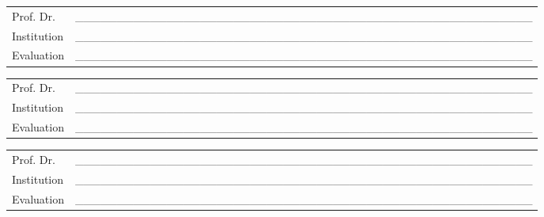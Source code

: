 \documentclass[
12pt,
openright,
oneside,
a4paper,
chapter=TITLE,
section=TITLE,
french,
spanish,
brazil,
english
]{abntex2}
\begin{document}
\begin{folhadeaprovacao}
  \vspace*{0.25cm}

  \noindent
  \begin{tabular}{m{2cm} P{14cm}}
    Prof. Dr. & \_\_\_\_\_\_\_\_\_\_\_\_\_\_\_\_\_\_\_\_\_\_\_\_\_\_\_\_\_\_\_\_\_\_\_\_\_\_\_\_\_\_\_\_\_\_\_\_\_\_\_\_\_\_\_ \\
    Institution & \_\_\_\_\_\_\_\_\_\_\_\_\_\_\_\_\_\_\_\_\_\_\_\_\_\_\_\_\_\_\_\_\_\_\_\_\_\_\_\_\_\_\_\_\_\_\_\_\_\_\_\_\_\_\_ \\
    Evaluation & \_\_\_\_\_\_\_\_\_\_\_\_\_\_\_\_\_\_\_\_\_\_\_\_\_\_\_\_\_\_\_\_\_\_\_\_\_\_\_\_\_\_\_\_\_\_\_\_\_\_\_\_\_\_\_ \\
  \end{tabular}

  \vspace*{0.5cm}

  \noindent
  \begin{tabular}{m{2cm} P{14cm}}
    Prof. Dr. & \_\_\_\_\_\_\_\_\_\_\_\_\_\_\_\_\_\_\_\_\_\_\_\_\_\_\_\_\_\_\_\_\_\_\_\_\_\_\_\_\_\_\_\_\_\_\_\_\_\_\_\_\_\_\_ \\
    Institution & \_\_\_\_\_\_\_\_\_\_\_\_\_\_\_\_\_\_\_\_\_\_\_\_\_\_\_\_\_\_\_\_\_\_\_\_\_\_\_\_\_\_\_\_\_\_\_\_\_\_\_\_\_\_\_ \\
    Evaluation & \_\_\_\_\_\_\_\_\_\_\_\_\_\_\_\_\_\_\_\_\_\_\_\_\_\_\_\_\_\_\_\_\_\_\_\_\_\_\_\_\_\_\_\_\_\_\_\_\_\_\_\_\_\_\_ \\
  \end{tabular}

  \vspace*{0.5cm}

  \noindent
  \begin{tabular}{m{2cm} P{14cm}}
    Prof. Dr. & \_\_\_\_\_\_\_\_\_\_\_\_\_\_\_\_\_\_\_\_\_\_\_\_\_\_\_\_\_\_\_\_\_\_\_\_\_\_\_\_\_\_\_\_\_\_\_\_\_\_\_\_\_\_\_ \\
    Institution & \_\_\_\_\_\_\_\_\_\_\_\_\_\_\_\_\_\_\_\_\_\_\_\_\_\_\_\_\_\_\_\_\_\_\_\_\_\_\_\_\_\_\_\_\_\_\_\_\_\_\_\_\_\_\_ \\
    Evaluation & \_\_\_\_\_\_\_\_\_\_\_\_\_\_\_\_\_\_\_\_\_\_\_\_\_\_\_\_\_\_\_\_\_\_\_\_\_\_\_\_\_\_\_\_\_\_\_\_\_\_\_\_\_\_\_ \\
  \end{tabular}
\end{folhadeaprovacao}

\end{document}
